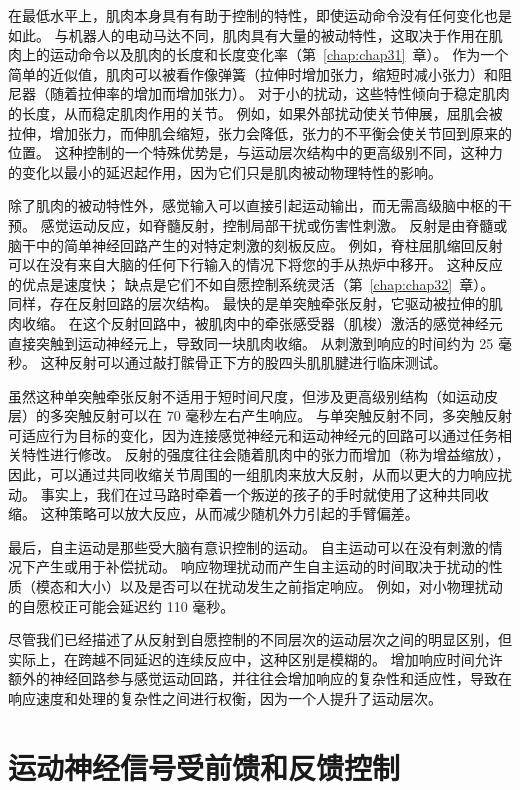 在最低水平上，肌肉本身具有有助于控制的特性，即使运动命令没有任何变化也是如此。
与机器人的电动马达不同，肌肉具有大量的被动特性，这取决于作用在肌肉上的运动命令以及肌肉的长度和长度变化率（第~\ref{chap:chap31}~章）。
作为一个简单的近似值，肌肉可以被看作像弹簧（拉伸时增加张力，缩短时减小张力）和阻尼器（随着拉伸率的增加而增加张力）。
对于小的扰动，这些特性倾向于稳定肌肉的长度，从而稳定肌肉作用的关节。
例如，如果外部扰动使关节伸展，屈肌会被拉伸，增加张力，而伸肌会缩短，张力会降低，张力的不平衡会使关节回到原来的位置。
这种控制的一个特殊优势是，与运动层次结构中的更高级别不同，这种力的变化以最小的延迟起作用，因为它们只是肌肉被动物理特性的影响。


除了肌肉的被动特性外，感觉输入可以直接引起运动输出，而无需高级脑中枢的干预。
感觉运动反应，如脊髓反射，控制局部干扰或伤害性刺激。
反射是由脊髓或脑干中的简单神经回路产生的对特定刺激的刻板反应。
例如，脊柱屈肌缩回反射可以在没有来自大脑的任何下行输入的情况下将您的手从热炉中移开。
这种反应的优点是速度快；
缺点是它们不如自愿控制系统灵活（第~\ref{chap:chap32}~章）。
同样，存在反射回路的层次结构。
最快的是单突触牵张反射，它驱动被拉伸的肌肉收缩。 
在这个反射回路中，被肌肉中的牵张感受器（肌梭）激活的感觉神经元直接突触到运动神经元上，导致同一块肌肉收缩。
从刺激到响应的时间约为 25 毫秒。
这种反射可以通过敲打髌骨正下方的股四头肌肌腱进行临床测试。


虽然这种单突触牵张反射不适用于短时间尺度，但涉及更高级别结构（如运动皮层）的多突触反射可以在 70 毫秒左右产生响应。
与单突触反射不同，多突触反射可适应行为目标的变化，因为连接感觉神经元和运动神经元的回路可以通过任务相关特性进行修改。
反射的强度往往会随着肌肉中的张力而增加（称为增益缩放），因此，可以通过共同收缩关节周围的一组肌肉来放大反射，从而以更大的力响应扰动。
事实上，我们在过马路时牵着一个叛逆的孩子的手时就使用了这种共同收缩。
这种策略可以放大反应，从而减少随机外力引起的手臂偏差。


最后，自主运动是那些受大脑有意识控制的运动。
自主运动可以在没有刺激的情况下产生或用于补偿扰动。
响应物理扰动而产生自主运动的时间取决于扰动的性质（模态和大小）以及是否可以在扰动发生之前指定响应。
例如，对小物理扰动的自愿校正可能会延迟约 110 毫秒。


尽管我们已经描述了从反射到自愿控制的不同层次的运动层次之间的明显区别，但实际上，在跨越不同延迟的连续反应中，这种区别是模糊的。
增加响应时间允许额外的神经回路参与感觉运动回路，并往往会增加响应的复杂性和适应性，导致在响应速度和处理的复杂性之间进行权衡，因为一个人提升了运动层次。



\section{运动神经信号受前馈和反馈控制}

